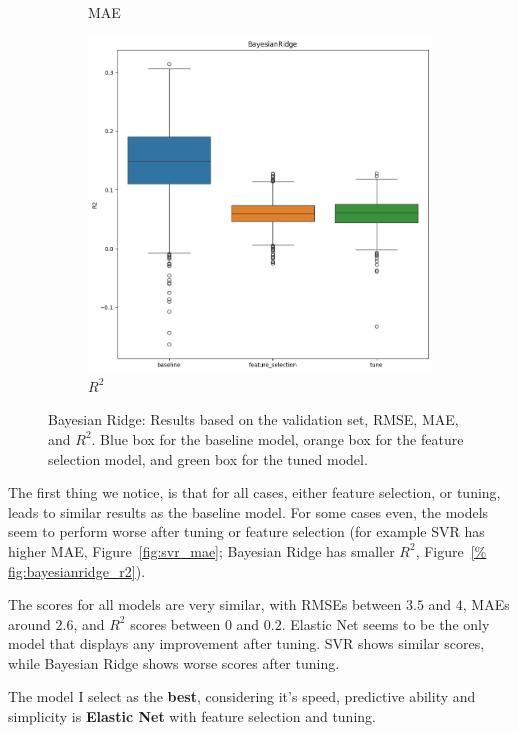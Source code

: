 \documentclass[12pt]{article}
\begin{document}
\begin{figure}[H]
\begin{subfigure}{0.3\textwidth}
        \caption{MAE}
        \label{fig:bayesianridge_mae}
    \end{subfigure}
    \begin{subfigure}{0.3\textwidth}
        \centering
        \includegraphics[width=\linewidth]{ims/bayesianridge_r2.png}
        \caption{$R^2$}
        \label{fig:bayesianridge_r2}
    \end{subfigure}
    \caption{Bayesian Ridge: Results based on the validation set, RMSE, MAE, and
    $R^2$. Blue box for the baseline model, orange box for the feature selection
    model, and green box for the tuned model.}
    \label{fig:bayesianridge_results}
\end{figure}

The first thing we notice, is that for all cases, either feature selection, or
tuning, leads to similar results as the baseline model. For some cases even, the
models seem to perform worse after tuning or feature selection (for example SVR has
higher MAE, Figure~\ref{fig:svr_mae}; Bayesian Ridge has smaller $R^2$, Figure~\ref{%
fig:bayesianridge_r2}).

The scores for all models are very similar, with RMSEs between $3.5$ and $4$, MAEs
around $2.6$, and $R^2$ scores between $0$ and $0.2$. Elastic Net seems to be the
only model that displays any improvement after tuning. SVR shows similar scores,
while Bayesian Ridge shows worse scores after tuning.

The model I select as the \textbf{best}, considering it's speed, predictive ability
and simplicity is \textbf{Elastic Net} with feature selection and tuning.
\end{document}
